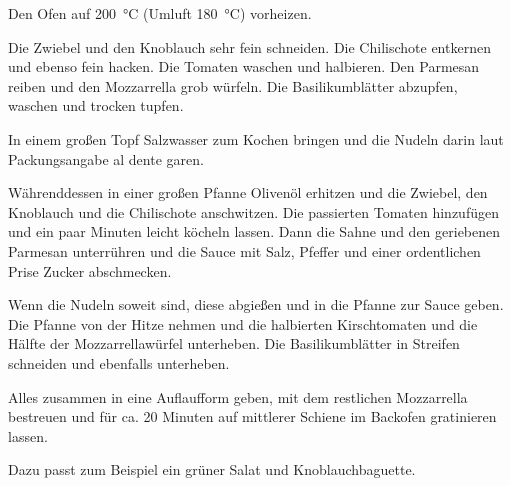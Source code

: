 \documentclass[a4paper]{recipe}
\begin{document}

Den Ofen auf \SI{200}{\celsius} (Umluft \SI{180}{\celsius}) vorheizen.

Die Zwiebel und den Knoblauch sehr fein schneiden. Die Chilischote entkernen
und ebenso fein hacken. Die Tomaten waschen und halbieren. Den Parmesan
reiben und den Mozzarrella grob würfeln. Die Basilikumblätter abzupfen, waschen
und trocken tupfen.

In einem großen Topf Salzwasser zum Kochen bringen und die Nudeln darin laut
Packungsangabe al dente garen.

Währenddessen in einer großen Pfanne Olivenöl erhitzen und die Zwiebel, den
Knoblauch und die Chilischote anschwitzen. Die passierten Tomaten hinzufügen
und ein paar Minuten leicht köcheln lassen. Dann die Sahne und den geriebenen
Parmesan unterrühren und die Sauce mit Salz, Pfeffer und einer ordentlichen
Prise Zucker abschmecken.

Wenn die Nudeln soweit sind, diese abgießen und in die Pfanne zur Sauce geben.
Die Pfanne von der Hitze nehmen und die halbierten Kirschtomaten und die Hälfte
der Mozzarrellawürfel unterheben. Die Basilikumblätter in Streifen schneiden
und ebenfalls unterheben.

Alles zusammen in eine Auflaufform geben, mit dem restlichen Mozzarrella
bestreuen und für ca. 20 Minuten auf mittlerer Schiene im Backofen gratinieren
lassen.

Dazu passt zum Beispiel ein grüner Salat und Knoblauchbaguette.
\end{document}
